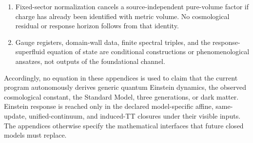 \documentclass[11pt]{article}
\begin{document}
\begin{enumerate}[label=(D\arabic*)]
	maximal-birth language, contact motifs, response multiplet, coherent arity
	or phase, an operator-Markov or square-operator Bell law, quantum
	geometry backreaction, a tight Lorentzian
continuum, spin--statistics or anomaly freedom, nonlinear BV symmetry, or a
nonperturbative quantum metric measure.
\item Fixed-sector normalization cancels a source-independent pure-volume
factor if charge has already been identified with metric volume.  No
cosmological residual or response horizon follows from that identity.
\item Gauge registers, domain-wall data, finite spectral triples, and the
response-superfluid equation of state are conditional constructions or
phenomenological ansatzes, not outputs of the foundational channel.
\end{enumerate}

Accordingly, no equation in these appendices is used to claim that the
current program autonomously derives generic quantum Einstein dynamics, the
observed cosmological constant, the Standard Model, three generations, or
dark matter.  Einstein response is reached only in the declared
model-specific affine, same-update, unified-continuum, and induced-TT
closures under their visible inputs.  The appendices otherwise specify the mathematical
interfaces that future closed models must replace.

\newpage


\end{document}
